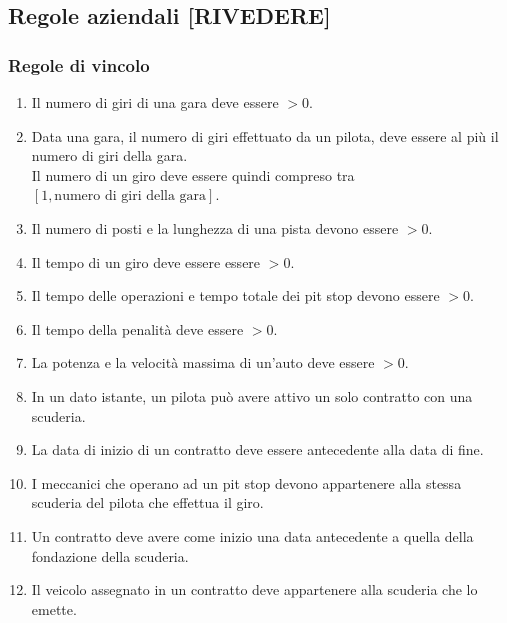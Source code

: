 \documentclass[11pt]{article}
\begin{document}
\subsection{Regole aziendali [RIVEDERE]}
\subsubsection{Regole di vincolo}
\begin{enumerate}[label={RV \arabic*}, leftmargin=4em]
    \item Il numero di giri di una gara deve essere $>0$.
    \item Data una gara, il numero di giri effettuato da un pilota, deve essere al più il numero di giri della gara.\\
          Il numero di un giro deve essere quindi compreso tra $[1, \text{numero di giri della gara}]$.
    \item Il numero di posti e la lunghezza di una pista devono essere $>0$. 
    \item Il tempo di un giro deve essere essere $>0$. 
    \item Il tempo delle operazioni e tempo totale dei pit stop devono essere $>0$.
    \item Il tempo della penalità deve essere $>0$.
    \item La potenza e la velocità massima di un'auto deve essere $>0$.
    \item In un dato istante, un pilota può avere attivo un solo contratto con una scuderia.
    \item La data di inizio di un contratto deve essere antecedente alla data di fine.
    \item I meccanici che operano ad un pit stop devono appartenere alla stessa scuderia del pilota che effettua il giro.
    \item Un contratto deve avere come inizio una data antecedente a quella della fondazione della scuderia.
    \item Il veicolo assegnato in un contratto deve appartenere alla scuderia che lo emette.
\end{enumerate}

\end{document}
